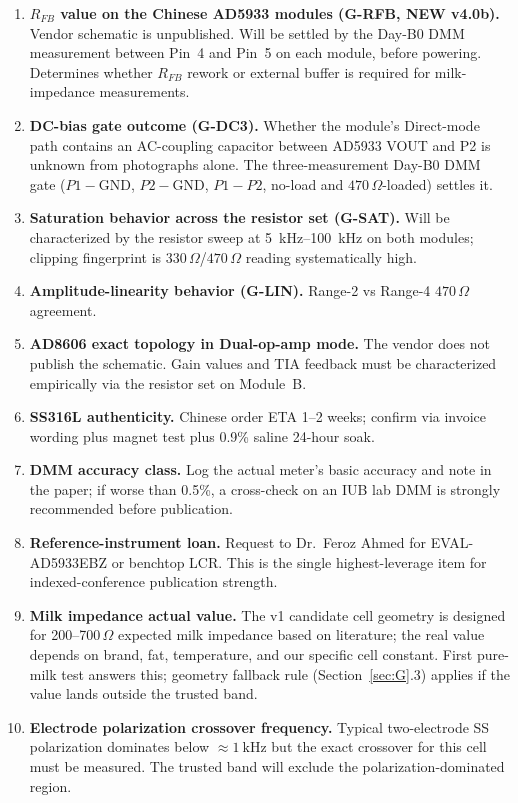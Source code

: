 \documentclass[11pt,a4paper]{article}
\newcommand{\Rohm}[1]{\ensuremath{#1\,\Omega}}
\begin{document}
\begin{enumerate}
\item \textbf{$R_{FB}$ value on the Chinese AD5933 modules (G-RFB, NEW v4.0b).} Vendor schematic is unpublished. Will be settled by the Day-B0 DMM measurement between Pin~4 and Pin~5 on each module, before powering. Determines whether $R_{FB}$ rework or external buffer is required for milk-impedance measurements.
\item \textbf{DC-bias gate outcome (G-DC3).} Whether the module's Direct-mode path contains an AC-coupling capacitor between AD5933 VOUT and P2 is unknown from photographs alone. The three-measurement Day-B0 DMM gate ($P1\!-\!\mathrm{GND}$, $P2\!-\!\mathrm{GND}$, $P1\!-\!P2$, no-load and \Rohm{470}-loaded) settles it.
\item \textbf{Saturation behavior across the resistor set (G-SAT).} Will be characterized by the resistor sweep at \SIrange{5}{100}{\kilo\hertz} on both modules; clipping fingerprint is \Rohm{330}/\Rohm{470} reading systematically high.
\item \textbf{Amplitude-linearity behavior (G-LIN).} Range-2 vs Range-4 \Rohm{470} agreement.
\item \textbf{AD8606 exact topology in Dual-op-amp mode.} The vendor does not publish the schematic. Gain values and TIA feedback must be characterized empirically via the resistor set on Module~B.
\item \textbf{SS316L authenticity.} Chinese order ETA 1--2 weeks; confirm via invoice wording plus magnet test plus 0.9\% saline 24-hour soak.
\item \textbf{DMM accuracy class.} Log the actual meter's basic accuracy and note in the paper; if worse than 0.5\%, a cross-check on an IUB lab DMM is strongly recommended before publication.
\item \textbf{Reference-instrument loan.} Request to Dr.\ Feroz Ahmed for EVAL-AD5933EBZ or benchtop LCR. This is the single highest-leverage item for indexed-conference publication strength.
\item \textbf{Milk impedance actual value.} The v1 candidate cell geometry is designed for 200--700\,$\Omega$ expected milk impedance based on literature; the real value depends on brand, fat, temperature, and our specific cell constant. First pure-milk test answers this; geometry fallback rule (Section~\ref{sec:G}.3) applies if the value lands outside the trusted band.
\item \textbf{Electrode polarization crossover frequency.} Typical two-electrode SS polarization dominates below $\approx\SI{1}{\kilo\hertz}$ but the exact crossover for this cell must be measured. The trusted band will exclude the polarization-dominated region.

\end{enumerate}
\end{document}
